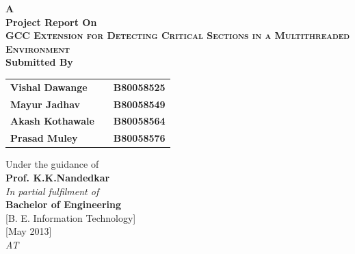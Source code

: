 
\newpage


\begin{center}
\thispagestyle{empty}


\Large{\textbf{A\\Project Report On}}\\[0.7cm]
\Large{\textsc {\textbf{GCC Extension for Detecting Critical Sections in a Multithreaded Environment}}}\\[0.5cm]
\Large{\textbf{Submitted By}}\\[0.5cm]
\begin{table}[h]
\centering
\begin{tabular}{>{\bfseries}lc>{\bfseries}r}
Vishal Dawange & & B80058525\\ %
Mayur Jadhav & & B80058549\\ %
Akash Kothawale & & B80058564\\ %
Prasad Muley & & B80058576\\ %
\end{tabular}
\end{table}
\large{Under the guidance of}\\[0.5cm]
\Large{\textbf{Prof. K.K.Nandedkar}}\\[0.4cm]
\large{\emph{In partial fulfilment of}}\\
\LARGE{\textbf{Bachelor of Engineering}}\\
\LARGE{{[}B. E. Information Technology{]}}\\[0.5cm]
\LARGE{{[}May 2013{]}}\\
\Large{\emph{AT}}\\[0.2cm]




\end{center}
